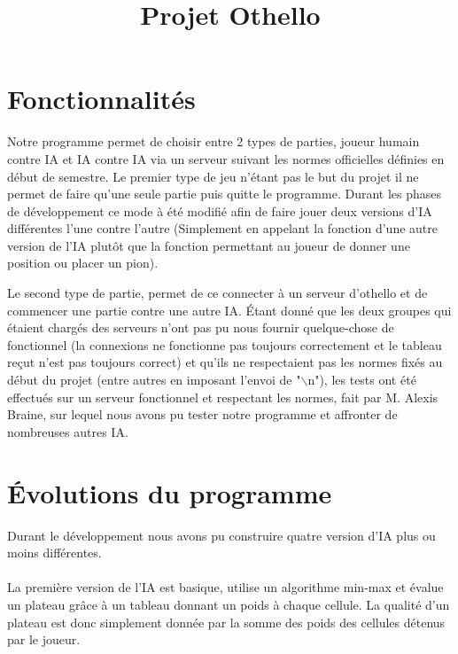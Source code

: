 \documentclass[a4paper,10pt]{article}
\title{Projet Othello}
\author{\bsc{Kevin Hivert} \bsc{Ronan Abhamon}}
\date{}
\begin{document}
\maketitle

\section{Fonctionnalités}
\noindent
Notre programme permet de choisir entre 2 types de parties, joueur humain contre IA et IA contre IA via un serveur suivant les normes officielles définies en début de semestre.
Le premier type de jeu n'étant pas le but du projet il ne permet de faire qu'une seule partie puis quitte le programme. Durant les phases de développement ce mode à été modifié afin de faire jouer deux versions d'IA différentes l'une contre l'autre (Simplement en appelant la fonction d'une autre version de l'IA plutôt que la fonction permettant au joueur de donner une position ou placer un pion).
~\par Le second type de partie, permet de ce connecter à un serveur d'othello et de commencer une partie contre une autre IA.
Étant donné que les deux groupes qui étaient chargés des serveurs n'ont pas pu nous fournir quelque-chose de fonctionnel (la connexions ne fonctionne pas toujours correctement et le tableau reçut n'est pas toujours correct) et qu'ils ne respectaient pas les normes fixés au début du projet (entre autres en imposant l'envoi de "$\backslash$n"), les tests ont été effectués sur un serveur fonctionnel et respectant les normes, fait par M. Alexis Braine, sur lequel nous avons pu tester notre programme et affronter de nombreuses autres IA.

\section{Évolutions du programme}
\noindent
Durant le développement nous avons pu construire quatre version d'IA plus ou moins différentes.

\paragraph{}La première version de l'IA est basique, utilise un algorithme min-max et évalue un plateau grâce à un tableau donnant un poids à chaque cellule. La qualité d'un plateau est donc simplement donnée par la somme des poids des cellules détenus par le joueur.
\end{document}
